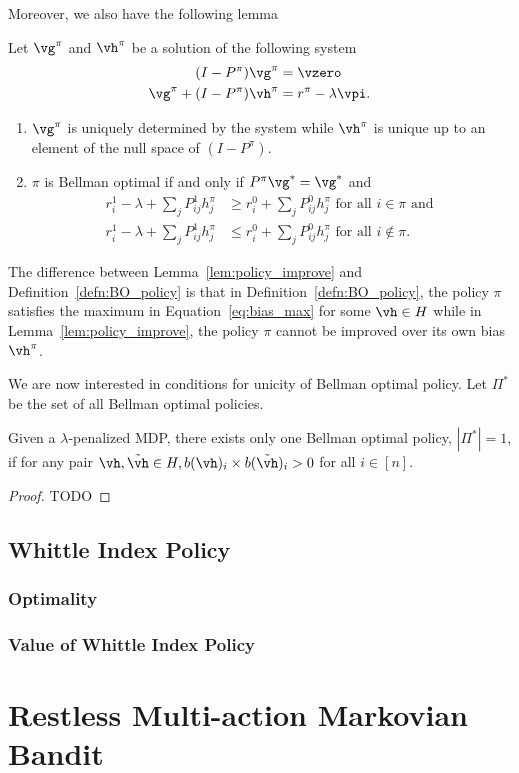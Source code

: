 Moreover, we also have the following lemma
\begin{lem}
    \label{lem:policy_improve}
    Let $\vg^\pi$ and $\vh^\pi$ be a solution of the following system
    \begin{align}
        (I-P^\pi)\vg^\pi &=\vzero \label{eq:gain_eval}\\
        \vg^\pi +(I-P^\pi)\vh^\pi &= r^\pi -\lambda\vpi \label{eq:bias_eval}.
    \end{align}
    \begin{enumerate}
        \item $\vg^\pi$ is uniquely determined by the system while $\vh^\pi$ is unique up to an element of the null space of $(I-P^\pi)$.
        \item $\pi$ is Bellman optimal if and only if $P^\pi\vg^*=\vg^*$ and
            \begin{align*}
                r^1_i-\lambda +\sum_{j}P^1_{ij}h^\pi_j &\ge r^0_i +\sum_{j}P^0_{ij}h^\pi_j \text{ for all } i\in\pi \text{ and } \\
                r^1_i-\lambda +\sum_{j}P^1_{ij}h^\pi_j &\le r^0_i +\sum_{j}P^0_{ij}h^\pi_j \text{ for all } i\notin\pi.
        \end{align*}
    \end{enumerate}
\end{lem}
The difference between Lemma~\ref{lem:policy_improve} and Definition~\ref{defn:BO_policy} is that in Definition~\ref{defn:BO_policy}, the policy $\pi$ satisfies the maximum in Equation~\eqref{eq:bias_max} for some $\vh\in H$ while in Lemma~\ref{lem:policy_improve}, the policy $\pi$ cannot be improved over its own bias $\vh^\pi$.

We are now interested in conditions for unicity of Bellman optimal policy.
Let $\Pi^*$ be the set of all Bellman optimal policies. 

\begin{lem}
\label{lem:unicity_BO}
Given a $\lambda$-penalized MDP, there exists only one Bellman optimal policy, $|\Pi^*|=1$, if for any pair $\vh, \tilde{\vh}\in H, b(\vh)_i\times b(\tilde{\vh})_i>0$ for all $i\in[n]$.
\end{lem}
\begin{proof}
    TODO
\end{proof}


\subsection{Whittle Index Policy}
\label{subsec:whittle_idx}

\subsubsection{Optimality}

\subsubsection{Value of Whittle Index Policy}

\section{Restless Multi-action Markovian Bandit}


